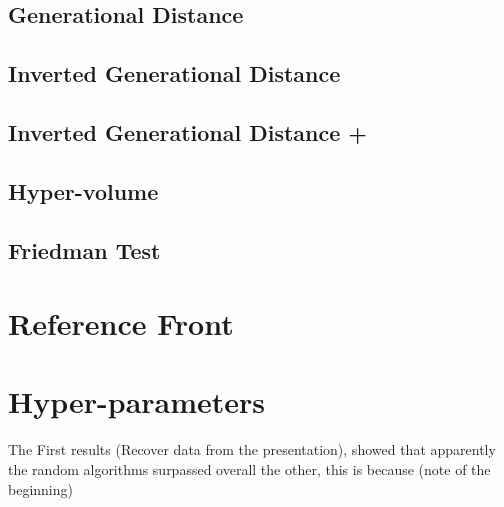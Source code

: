 \subsection{Generational Distance}
\subsection{Inverted Generational Distance}
\subsection{Inverted Generational Distance +}
\subsection{Hyper-volume}
\subsection{Friedman Test}

\section{Reference Front}

\section{Hyper-parameters}



The First results (Recover data from the presentation), showed that apparently the random algorithms surpassed overall the other, this is because (note of the beginning) 